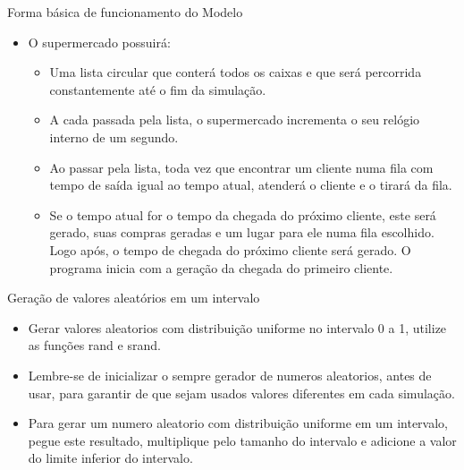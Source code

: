 \documentclass[12pt,table,xcolor={dvipsnames}]{beamer}
\begin{document}
\begin{frame}[fragile]{Forma básica de funcionamento do Modelo}
\begin{itemize}
\item O supermercado possuirá:
\begin{itemize}
\item Uma lista circular que conterá todos os caixas e que será percorrida constantemente até o fim da simulação.
\item A cada passada pela lista, o supermercado incrementa o seu relógio interno de um segundo.
\item Ao passar pela lista, toda vez que encontrar um cliente numa fila com tempo de saída igual ao tempo atual, atenderá o cliente e o tirará da fila.
\item Se o tempo atual for o tempo da chegada do próximo cliente, este será gerado, suas compras geradas e um lugar para ele numa fila escolhido. Logo após, o tempo de chegada do próximo cliente será gerado. O programa inicia com a geração da chegada do primeiro cliente.
\end{itemize}
\end{itemize}
\end{frame}

\begin{frame}[fragile]{Geração de valores aleatórios em um intervalo}
\begin{itemize}
\item Gerar valores aleatorios com distribuição uniforme no intervalo 0 a 1, utilize as funções rand e srand.
\item Lembre-se de inicializar o sempre gerador de numeros aleatorios, antes de usar, para garantir de que sejam usados valores diferentes em cada simulação.
\item Para gerar um numero aleatorio com distribuição uniforme em um intervalo, pegue este resultado, multiplique pelo tamanho do intervalo e adicione a valor do limite inferior do intervalo. 
\end{itemize}
\end{frame}
\end{document}
